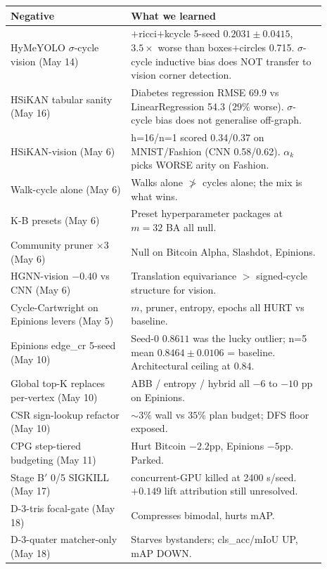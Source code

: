 \documentclass[11pt,a4paper]{article}
\begin{document}
\begin{center}\small
\begin{tabular}{p{0.34\linewidth} p{0.55\linewidth}}
\toprule
Negative & What we learned \\
\midrule
HyMeYOLO $\sigma$-cycle vision (May 14)        & $+$ricci$+$kcycle 5-seed $0.2031 \pm 0.0415$, $3.5\times$ worse than boxes$+$circles 0.715. $\sigma$-cycle inductive bias does NOT transfer to vision corner detection. \\
HSiKAN tabular sanity (May 16)            & Diabetes regression RMSE 69.9 vs LinearRegression 54.3 ($29\%$ worse). $\sigma$-cycle bias does not generalise off-graph. \\
HSiKAN-vision (May 6)                     & h=16/n=1 scored 0.34/0.37 on MNIST/Fashion (CNN 0.58/0.62). $\alpha_k$ picks WORSE arity on Fashion. \\
Walk-cycle alone (May 6)                  & Walks alone $\not>$ cycles alone; the mix is what wins. \\
K-B presets (May 6)                       & Preset hyperparameter packages at $m{=}32$ BA all null. \\
Community pruner $\times 3$ (May 6)       & Null on Bitcoin Alpha, Slashdot, Epinions. \\
HGNN-vision $-0.40$ vs CNN (May 6)        & Translation equivariance $>$ signed-cycle structure for vision. \\
Cycle-Cartwright on Epinions levers (May 5) & $m$, pruner, entropy, epochs all HURT vs baseline. \\
Epinions edge\_cr 5-seed (May 10)         & Seed-0 $0.8611$ was the lucky outlier; n=5 mean $0.8464 \pm 0.0106$ = baseline. Architectural ceiling at $0.84$. \\
Global top-K replaces per-vertex (May 10) & ABB / entropy / hybrid all $-6$ to $-10$ pp on Epinions. \\
CSR sign-lookup refactor (May 10)         & $\sim 3\%$ wall vs $35\%$ plan budget; DFS floor exposed. \\
CPG step-tiered budgeting (May 11)        & Hurt Bitcoin $-2.2$pp, Epinions $-5$pp. Parked. \\
Stage B$'$ 0/5 SIGKILL (May 17)           & concurrent-GPU killed at 2400 s/seed. $+0.149$ lift attribution still unresolved. \\
D-3-tris focal-gate (May 18)              & Compresses bimodal, hurts mAP. \\
D-3-quater matcher-only (May 18)          & Starves bystanders; cls\_acc/mIoU UP, mAP DOWN. \\
\bottomrule
\end{tabular}
\end{center}
\end{document}
